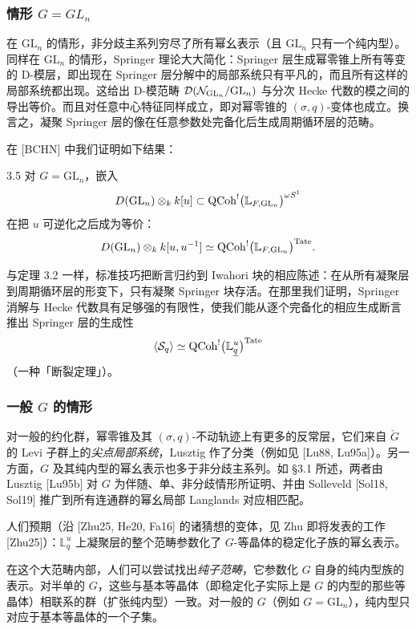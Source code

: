 \subsubsection{情形 $G=GL_n$}
在 $\mathrm{GL}_n$ 的情形，非分歧主系列穷尽了所有幂幺表示（且 $\mathrm{GL}_n$ 只有一个纯内型）。同样在 $\mathrm{GL}_n$ 的情形，Springer 理论大大简化：Springer 层生成幂零锥上所有等变的 D-模层，即出现在 Springer 层分解中的局部系统只有平凡的，而且所有这样的局部系统都出现。这给出 D-模范畴 $\mathcal{D}(\mathcal{N}_{\mathrm{GL}_n}/\mathrm{GL}_n)$ 与分次 Hecke 代数的模之间的导出等价。而且对任意中心特征同样成立，即对幂零锥的 $(\sigma,q)$-变体也成立。换言之，凝聚 Springer 层的像在任意参数处完备化后生成周期循环层的范畴。

在 [BCHN] 中我们证明如下结果：

\begin{thm}{3.5}\label{thm:a5-02-10}
对 $G=\mathrm{GL}_n$，嵌入
\[
D(\mathrm{GL}_n)\otimes_k k[u]\subset\operatorname{QCoh}^{!}\bigl(\mathbb L_{F,\mathrm{GL}_n}\bigr)^{\omega S^1}
\]
在把 $u$ 可逆化之后成为等价：
\[
D(\mathrm{GL}_n)\otimes_k k[u,u^{-1}]\simeq\operatorname{QCoh}^{!}\bigl(\mathbb L_{F,\mathrm{GL}_n}\bigr)^{\mathrm{Tate}}.
\]
\end{thm}

与定理 3.2 一样，标准技巧把断言归约到 Iwahori 块的相应陈述：在从所有凝聚层到周期循环层的形变下，只有凝聚 Springer 块存活。在那里我们证明，Springer 消解与 Hecke 代数具有足够强的有限性，使我们能从逐个完备化的相应生成断言推出 Springer 层的生成性
\[
\langle\mathcal S_q\rangle\simeq\operatorname{QCoh}^{!}\bigl(\mathbb L^u_{\underline q}\bigr)^{\mathrm{Tate}}
\]
（一种「断裂定理」）。

\subsubsection{一般 $G$ 的情形}
对一般的约化群，幂零锥及其 $(\sigma,q)$-不动轨迹上有更多的反常层，它们来自 $\check G$ 的 Levi 子群上的\emph{尖点局部系统}，Lusztig 作了分类（例如见 [Lu88, Lu95a]）。另一方面，$G$ 及其纯内型的幂幺表示也多于非分歧主系列。如 §3.1 所述，两者由 Lusztig [Lu95b] 对 $G$ 为伴随、单、非分歧情形所证明、并由 Solleveld [Sol18, Sol19] 推广到所有连通群的幂幺局部 Langlands 对应相匹配。

人们预期（沿 [Zhu25, He20, Fa16] 的诸猜想的变体，见 Zhu 即将发表的工作 [Zhu25]）：$\mathbb L^u_q$ 上凝聚层的整个范畴参数化了 $G$-等晶体的稳定化子族的幂幺表示。

在这个大范畴内部，人们可以尝试找出\emph{纯子范畴}，它参数化 $G$ 自身的纯内型族的表示。对半单的 $G$，这些与基本等晶体（即稳定化子实际上是 $G$ 的内型的那些等晶体）相联系的群（扩张纯内型）一致。对一般的 $G$（例如 $G=\mathrm{GL}_n$），纯内型只对应于基本等晶体的一个子集。

